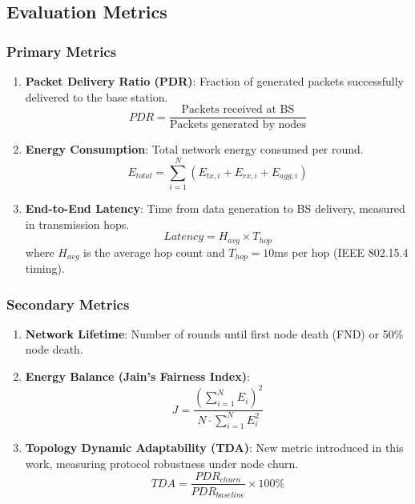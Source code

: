 \subsection{Evaluation Metrics}

\subsubsection{Primary Metrics}

\begin{enumerate}
    \item \textbf{Packet Delivery Ratio (PDR)}: Fraction of generated packets
    successfully delivered to the base station.
    \begin{equation}
    PDR = \frac{\text{Packets received at BS}}{\text{Packets generated by nodes}}
    \label{eq:pdr}
    \end{equation}

    \item \textbf{Energy Consumption}: Total network energy consumed per round.
    \begin{equation}
    E_{total} = \sum_{i=1}^{N} (E_{tx,i} + E_{rx,i} + E_{agg,i})
    \label{eq:energy}
    \end{equation}

    \item \textbf{End-to-End Latency}: Time from data generation to BS delivery,
    measured in transmission hops.
    \begin{equation}
    Latency = H_{avg} \times T_{hop}
    \label{eq:latency}
    \end{equation}
    where $H_{avg}$ is the average hop count and $T_{hop} = 10$ms per hop
    (IEEE 802.15.4 timing).
\end{enumerate}

\subsubsection{Secondary Metrics}

\begin{enumerate}
    \item \textbf{Network Lifetime}: Number of rounds until first node death
    (FND) or 50\% node death.

    \item \textbf{Energy Balance (Jain's Fairness Index)}:
    \begin{equation}
    J = \frac{(\sum_{i=1}^{N} E_i)^2}{N \cdot \sum_{i=1}^{N} E_i^2}
    \label{eq:jain}
    \end{equation}

    \item \textbf{Topology Dynamic Adaptability (TDA)}: New metric introduced
    in this work, measuring protocol robustness under node churn.
    \begin{equation}
    TDA = \frac{PDR_{churn}}{PDR_{baseline}} \times 100\%
    \label{eq:tda}
    \end{equation}
\end{enumerate}

